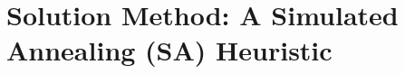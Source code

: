 \documentclass[11pt]{article}
\begin{document}







\section{Solution Method: A Simulated Annealing (SA) Heuristic}  \label{s:res}
\end{document}
